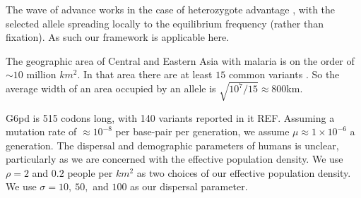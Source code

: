 \documentclass{article}
\begin{document}
The wave of advance works in the case of heterozygote advantage
\citep{aronson1975nonlinear}, with the selected allele spreading
locally to the equilibrium frequency (rather than fixation). As such
our framework is applicable here.








The geographic area of Central and Eastern Asia with malaria is on the
order of $\sim 10$ million $km^2$. In that area there are at least $15$
common variants \citep{Howes-g6pd-variants}. So the average width of
an area occupied by an allele is $\sqrt{10^7/15} \approx  800$km. 


G6pd is 515 codons long, with 140 variants reported in it REF. Assuming a
mutation rate of $\approx 10^{-8}$ per base-pair per generation, we assume
$\mu \approx 1 \times 10^{-6}$ a generation. 
The dispersal and demographic parameters of humans is unclear,
particularly as we are concerned with the effective population density.
We use $\rho=2$ and $0.2$ people per $km^2$ as two choices of our effective population density.
We use $\sigma=10,~50,$ and $100$ as our dispersal parameter.
\end{document}
